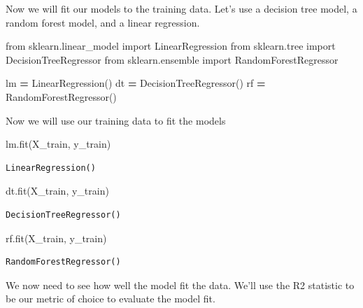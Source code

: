 \documentclass[
  letterpaper,
]{scrbook}
\newenvironment{Shaded}{\begin{snugshade}}{\end{snugshade}}
\newcommand{\ImportTok}[1]{#1}
\newcommand{\NormalTok}[1]{#1}
\newcommand{\OperatorTok}[1]{\textcolor[rgb]{0.81,0.36,0.00}{\textbf{#1}}}
\begin{document}
Now we will fit our models to the training data. Let's use a decision tree model, a random forest model, and a linear regression.

\begin{Shaded}
\begin{Highlighting}[]
\ImportTok{from}\NormalTok{ sklearn.linear_model }\ImportTok{import}\NormalTok{ LinearRegression}
\ImportTok{from}\NormalTok{ sklearn.tree }\ImportTok{import}\NormalTok{ DecisionTreeRegressor}
\ImportTok{from}\NormalTok{ sklearn.ensemble }\ImportTok{import}\NormalTok{ RandomForestRegressor}

\NormalTok{lm }\OperatorTok{=}\NormalTok{ LinearRegression()}
\NormalTok{dt }\OperatorTok{=}\NormalTok{ DecisionTreeRegressor()}
\NormalTok{rf }\OperatorTok{=}\NormalTok{ RandomForestRegressor()}
\end{Highlighting}
\end{Shaded}

Now we will use our training data to fit the models

\begin{Shaded}
\begin{Highlighting}[]
\NormalTok{lm.fit(X_train, y_train)}
\end{Highlighting}
\end{Shaded}

\begin{verbatim}
LinearRegression()
\end{verbatim}

\begin{Shaded}
\begin{Highlighting}[]
\NormalTok{dt.fit(X_train, y_train)}
\end{Highlighting}
\end{Shaded}

\begin{verbatim}
DecisionTreeRegressor()
\end{verbatim}

\begin{Shaded}
\begin{Highlighting}[]
\NormalTok{rf.fit(X_train, y_train)}
\end{Highlighting}
\end{Shaded}

\begin{verbatim}
RandomForestRegressor()
\end{verbatim}

We now need to see how well the model fit the data. We'll use the R2 statistic to be our metric of choice to evaluate the model fit.
\end{document}
